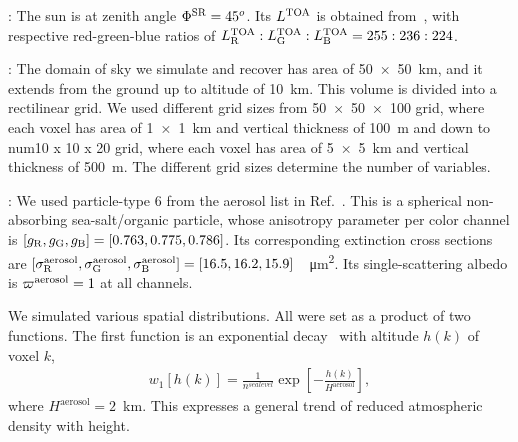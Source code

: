 \documentclass[10pt,letterpaper]{article}
\begin{document}
: The sun is at zenith angle $\Phi^{\rm
  SR}=45^o$. Its $L^{\rm TOA}$ is obtained
from~\cite{BBradiance,sun_composition}, with respective red-green-blue
ratios of $L^{\rm TOA}_{\rm R}:L^{\rm TOA}_{\rm G}:L^{\rm TOA}_{\rm
  B}=255:236:224$.

: The domain of sky we simulate and recover
has area of \SI{50 x 50}{\km}, and it extends from the ground up to
altitude of \SI{10}{\km}. This volume is divided into a rectilinear
grid. We used different grid sizes from \num{50 x 50 x 100} grid,
where each voxel has area of \SI{1 x 1}{\km} and vertical thickness of
\SI{100}{\metre} and down to num{10 x 10 x 20} grid, where each voxel
has area of \SI{5 x 5}{\km} and vertical thickness of
\SI{500}{\metre}. The different grid sizes determine the number of
variables.

: We used particle-type 6 from the aerosol list
in Ref.~\cite{Martonchik2009}. This is a spherical non-absorbing
sea-salt/organic particle, whose anisotropy parameter per color
channel is $[g_{\rm R},g_{\rm G},g_{\rm B}]=[0.763,0.775,0.786]$. Its
corresponding extinction cross sections are $[\sigma^{\rm
  aerosol}_{\rm R}, \sigma^{\rm aerosol}_{\rm G}, \sigma^{\rm
  aerosol}_{\rm
  B}]=[16.5,16.2,15.9]$~\si[sticky-per]{\per\micro\meter\squared}.
Its single-scattering albedo is $\varpi^{\rm aerosol}=1$ at all
channels.

We simulated various spatial distributions. All were set as a product
of two functions. The first function is an exponential
decay~\cite{Levi1980} with altitude $h(k)$ of voxel $k$,
\begin{align}
  w_1[h(k)] = \frac{1} {n^{sea level}}
  \exp\left[-\frac{h(k)}{H^\mathrm{aerosol}}\right],
\end{align}
where $H^\mathrm{aerosol}=2$~\si{\km}. This expresses a general trend
of reduced atmospheric density with height.
\end{document}
